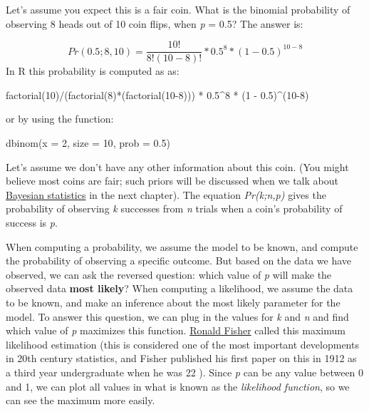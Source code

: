 \documentclass[
  oneside]{book}
\newenvironment{Shaded}{\begin{snugshade}}{\end{snugshade}}
\newcommand{\AttributeTok}[1]{\textcolor[rgb]{0.77,0.63,0.00}{#1}}
\newcommand{\DecValTok}[1]{\textcolor[rgb]{0.00,0.00,0.81}{#1}}
\newcommand{\FloatTok}[1]{\textcolor[rgb]{0.00,0.00,0.81}{#1}}
\newcommand{\FunctionTok}[1]{\textcolor[rgb]{0.00,0.00,0.00}{#1}}
\newcommand{\NormalTok}[1]{#1}
\newcommand{\SpecialCharTok}[1]{\textcolor[rgb]{0.00,0.00,0.00}{#1}}
\begin{document}
Let's assume you expect this is a fair coin. What is the binomial probability of observing 8 heads out of 10 coin flips, when \emph{p} = 0.5? The answer is:

\[
Pr\left(0.5;8,10 \right) = \frac{10!}{8!\left( 10 - 8 \right)!}*0.5^{8}*{(1 - 0.5)}^{10 - 8}
\]
In R this probability is computed as as:

\begin{Shaded}
\begin{Highlighting}[]
\FunctionTok{factorial}\NormalTok{(}\DecValTok{10}\NormalTok{)}\SpecialCharTok{/}\NormalTok{(}\FunctionTok{factorial}\NormalTok{(}\DecValTok{8}\NormalTok{)}\SpecialCharTok{*}\NormalTok{(}\FunctionTok{factorial}\NormalTok{(}\DecValTok{10{-}8}\NormalTok{))) }\SpecialCharTok{*} \FloatTok{0.5}\SpecialCharTok{\^{}}\DecValTok{8} \SpecialCharTok{*}\NormalTok{ (}\DecValTok{1} \SpecialCharTok{{-}} \FloatTok{0.5}\NormalTok{)}\SpecialCharTok{\^{}}\NormalTok{(}\DecValTok{10{-}8}\NormalTok{)}
\end{Highlighting}
\end{Shaded}

or by using the function:

\begin{Shaded}
\begin{Highlighting}[]
\FunctionTok{dbinom}\NormalTok{(}\AttributeTok{x =} \DecValTok{2}\NormalTok{, }\AttributeTok{size =} \DecValTok{10}\NormalTok{, }\AttributeTok{prob =} \FloatTok{0.5}\NormalTok{)}
\end{Highlighting}
\end{Shaded}

Let's assume we don't have any other information about this coin. (You might believe most coins are fair; such priors will be discussed when we talk about \protect\hyperlink{bayes}{Bayesian statistics} in the next chapter). The equation \emph{Pr(k;n,p)} gives the probability of observing \emph{k} successes from \emph{n} trials when a coin's probability of success is \emph{p}.

When computing a probability, we assume the model to be known, and compute the probability of observing a specific outcome. But based on the data we have observed, we can ask the reversed question: which value of \emph{p} will make the observed data \textbf{most likely}? When computing a likelihood, we assume the data to be known, and make an inference about the most likely parameter for the model. To answer this question, we can plug in the values for \emph{k} and \emph{n} and find which value of \emph{p} maximizes this function. \href{https://en.wikipedia.org/wiki/Ronald_Fisher}{Ronald Fisher} called this maximum likelihood estimation (this is considered one of the most important developments in 20th century statistics, and Fisher published his first paper on this in 1912 as a third year undergraduate when he was 22 \citep{aldrich_r_1997}). Since \emph{p} can be any value between 0 and 1, we can plot all values in what is known as the \emph{likelihood function}, so we can see the maximum more easily.
\end{document}
